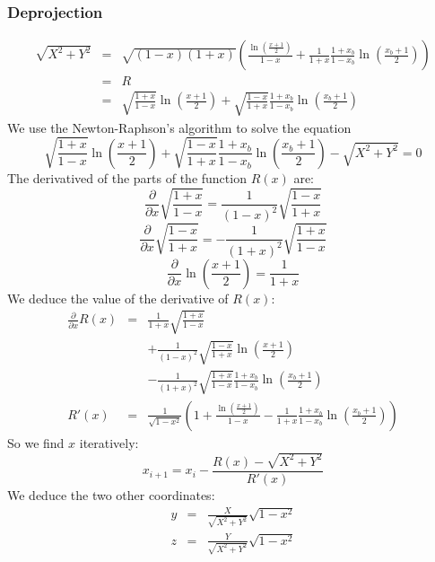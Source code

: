   \subsubsection{Deprojection}

    \begin{eqnarray}
      \sqrt{X^2 + Y^2}
        & = & \sqrt{(1-x)(1+x)}\left(\frac{\ln(\frac{x+1}{2})}{1-x}
              + \frac{1}{1+x}\frac{1 + x_b}{1 - x_b}\ln(\frac{x_b+1}{2}) \right) \\
        & = & R \\ 
        & = & \sqrt{\frac{1 + x}{1 - x}} \ln(\frac{x+1}{2})
        + \sqrt{\frac{1 - x}{1 + x}} \frac{1 + x_b}{1 - x_b}\ln(\frac{x_b+1}{2}) 
    \end{eqnarray}
    We use the Newton-Raphson's algorithm to solve the equation
    \begin{equation}
      \sqrt{\frac{1 + x}{1 - x}} \ln(\frac{x+1}{2})
        + \sqrt{\frac{1 - x}{1 + x}} \frac{1 + x_b}{1 - x_b}\ln(\frac{x_b+1}{2}) - \sqrt{X^2+Y^2} = 0
    \end{equation}
    The derivatived of the parts of the function $R(x)$ are:
    \begin{equation}
      \frac{\partial}{\partial x} \sqrt{\frac{1+x}{1-x}} = \frac{1}{(1-x)^2}\sqrt{\frac{1-x}{1+x}}
    \end{equation}
    \begin{equation}
      \frac{\partial}{\partial x} \sqrt{\frac{1-x}{1+x}} = -\frac{1}{(1+x)^2}\sqrt{\frac{1+x}{1-x}}
    \end{equation}
    \begin{equation}
      \frac{\partial}{\partial x} \ln(\frac{x+1}{2}) = \frac{1}{1+x}
    \end{equation} 
    We deduce the value of the derivative of $R(x)$:
    \begin{eqnarray}
      \frac{\partial}{\partial x} R(x) & = & \frac{1}{1+x}\sqrt{\frac{1+x}{1-x}} \\
        & & + \frac{1}{(1-x)^2}\sqrt{\frac{1-x}{1+x}}\ln(\frac{x+1}{2}) \\
        & & -\frac{1}{(1+x)^2}\sqrt{\frac{1+x}{1-x}} \frac{1 + x_b}{1 - x_b}\ln(\frac{x_b+1}{2}) \\
       R'(x) & = & \frac{1}{\sqrt{1-x^2}}\left(1 + \frac{\ln(\frac{x+1}{2})}{1-x}
                - \frac{1}{1+x}\frac{1 + x_b}{1 - x_b}\ln(\frac{x_b+1}{2})
              \right)
    \end{eqnarray}
    So we find $x$ iteratively:
    \begin{equation}
      x_{i+1} = x_i - \frac{R(x) - \sqrt{X^2 + Y^2}}{R'(x)}
    \end{equation}
    We deduce the two other coordinates:
    \begin{eqnarray}
      y & = & \frac{X}{\sqrt{X^2 + Y^2}}\sqrt{1 - x^2} \\
      z & = & \frac{Y}{\sqrt{X^2 + Y^2}}\sqrt{1 - x^2}
    \end{eqnarray}

